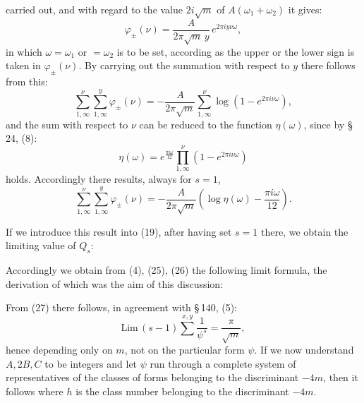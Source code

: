 
carried out, and with regard to the value $2i\sqrt m$ of $A(\omega_1+\omega_2)$ it gives:
\[
\varphi_\pm(\nu) = \frac{A}{2\pi\sqrt m\,y}\,e^{2\pi i y\nu\omega},
\]
in which $\omega=\omega_1$ or $=\omega_2$ is to be set, according as the upper or the lower sign is taken in $\varphi_\pm(\nu)$. By carrying out the summation with respect to $y$ there follows from this:
\[
\sum_{1,\infty}^{\nu}\sum_{1,\infty}^{y}\varphi_\pm(\nu) = -\frac{A}{2\pi\sqrt m}\sum_{1,\infty}^{\nu}\log\left(1-e^{2\pi i\nu\omega}\right),
\]
and the sum with respect to $\nu$ can be reduced to the function $\eta(\omega)$, since by \S\,24, (8):
\[
\eta(\omega) = e^{\frac{\pi i \omega}{12}}\prod_{1,\infty}^{\nu}\left(1-e^{2\pi i\nu\omega}\right)
\]
holds. Accordingly there results, always for $s=1$,
\[
\sum_{1,\infty}^{\nu}\sum_{1,\infty}^{y}\varphi_\pm(\nu) = -\frac{A}{2\pi\sqrt m}\left(\log\eta(\omega) - \frac{\pi i \omega}{12}\right).
\]

If we introduce this result into (19), after having set $s=1$ there, we obtain the limiting value of $Q_s$:

Accordingly we obtain from (4), (25), (26) the following limit formula, the derivation of which was the aim of this discussion:

From (27) there follows, in agreement with \S\,140, (5):
\[
\mathrm{Lim}\,(s-1)\sum^{x,y}\frac{1}{\psi^s} = \frac{\pi}{\sqrt m},
\]
hence depending only on $m$, not on the particular form $\psi$. If we now understand $A, 2B, C$ to be integers and let $\psi$ run through a complete system of representatives of the classes of forms belonging to the discriminant $-4m$, then it follows
where $h$ is the class number belonging to the discriminant $-4m$.
